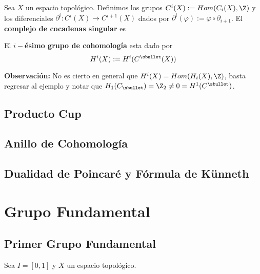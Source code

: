 \documentclass{article}
\begin{document}
\vspace{2mm}
\begin{dfn}
    Sea $X$ un espacio topológico. Definimos los grupos $C^{i}(X):=Hom(C_{i}(X),\Z)$ y los 
    diferenciales $\partial^{i}:C^{i}(X)\to C^{i+1}(X)$ dados por $\partial^{i}(\varphi)
    :=\varphi\circ\partial_{i+1}$. El \textbf{complejo de cocadenas singular} es
    
    \vspace{2mm}
    \centerline{
    }

    \vspace{2mm}
    \noindent El \textbf{$i-$ésimo grupo de cohomología} esta dado por
    \begin{equation*}
        H^{i}(X):=H^{i}(C^{\sbullet}(X))
    \end{equation*}
\end{dfn}

\noindent\textbf{Observación:} No es cierto en general que $H^{i}(X)=Hom(H_{i}(X),\Z)$, basta 
regresar al ejemplo y notar que $H_{1}(C_{\sbullet})=\Z_{2}\neq0=H^{1}(C^{\sbullet})$.

\newpage
\subsection{Producto Cup}

\newpage
\subsection{Anillo de Cohomología}

\newpage
\subsection{Dualidad de Poincaré y Fórmula de Künneth}

\newpage
\section{Grupo Fundamental}

\subsection{Primer Grupo Fundamental}
\noindent Sea $I=[0,1]$ y $X$ un espacio topológico.
\end{document}
